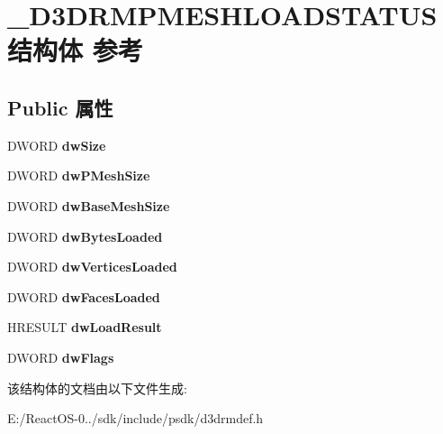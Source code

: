 \hypertarget{struct___d3_d_r_m_p_m_e_s_h_l_o_a_d_s_t_a_t_u_s}{}\section{\+\_\+\+D3\+D\+R\+M\+P\+M\+E\+S\+H\+L\+O\+A\+D\+S\+T\+A\+T\+U\+S结构体 参考}
\label{struct___d3_d_r_m_p_m_e_s_h_l_o_a_d_s_t_a_t_u_s}
\subsection*{Public 属性}
\begin{DoxyCompactItemize}
\item 
\mbox{\label{struct___d3_d_r_m_p_m_e_s_h_l_o_a_d_s_t_a_t_u_s_aa84cf533623d75a6de586103920a7871}} 
D\+W\+O\+RD {\bfseries dw\+Size}
\item 
\mbox{\label{struct___d3_d_r_m_p_m_e_s_h_l_o_a_d_s_t_a_t_u_s_a7cc02e740dc2ff27da8e551fde20f92c}} 
D\+W\+O\+RD {\bfseries dw\+P\+Mesh\+Size}
\item 
\mbox{\label{struct___d3_d_r_m_p_m_e_s_h_l_o_a_d_s_t_a_t_u_s_a7b20a1c8b65d2dfaeffe5650941bf39d}} 
D\+W\+O\+RD {\bfseries dw\+Base\+Mesh\+Size}
\item 
\mbox{\label{struct___d3_d_r_m_p_m_e_s_h_l_o_a_d_s_t_a_t_u_s_ad3ad38828a6302316086fd10a4bf4faa}} 
D\+W\+O\+RD {\bfseries dw\+Bytes\+Loaded}
\item 
\mbox{\label{struct___d3_d_r_m_p_m_e_s_h_l_o_a_d_s_t_a_t_u_s_a4ab4123845f193570cc0df64d417686b}} 
D\+W\+O\+RD {\bfseries dw\+Vertices\+Loaded}
\item 
\mbox{\label{struct___d3_d_r_m_p_m_e_s_h_l_o_a_d_s_t_a_t_u_s_afd3d33c2c26ca9e6a5021d9f5ce96ad5}} 
D\+W\+O\+RD {\bfseries dw\+Faces\+Loaded}
\item 
\mbox{\label{struct___d3_d_r_m_p_m_e_s_h_l_o_a_d_s_t_a_t_u_s_abe7ccf22b81012c19d372ed9a47f2421}} 
H\+R\+E\+S\+U\+LT {\bfseries dw\+Load\+Result}
\item 
\mbox{\label{struct___d3_d_r_m_p_m_e_s_h_l_o_a_d_s_t_a_t_u_s_adfbe474ba3a33514672794658e2e7763}} 
D\+W\+O\+RD {\bfseries dw\+Flags}
\end{DoxyCompactItemize}


该结构体的文档由以下文件生成\+:\begin{DoxyCompactItemize}
\item 
E\+:/\+React\+O\+S-\/0../sdk/include/psdk/d3drmdef.\+h\end{DoxyCompactItemize}
